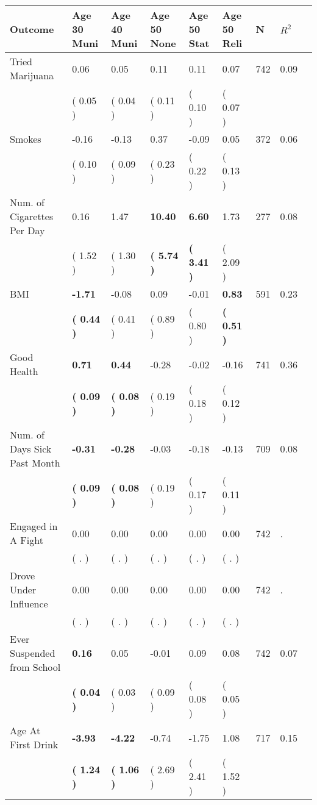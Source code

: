 \begin{tabular}{L{6.2cm} C{1.8cm} C{1.8cm} C{1.8cm} C{1.8cm} C{1.8cm} C{1.8cm} C{0.3cm} C{0.3cm}}
\toprule
 \textbf{Outcome} & \textbf{Age 30 Muni} & \textbf{Age 40 Muni} & \textbf{Age 50 None} & \textbf{Age 50 Stat} & \textbf{Age 50 Reli} & \textbf{N} & \textbf{$ R^2$} \\
\midrule
Tried Marijuana &      0.06 &      0.05 &      0.11 &      0.11 &      0.07  & 742 &       0.09 \\ 
 & (     0.05 ) & (     0.04 ) & (     0.11 ) & (     0.10 ) & (     0.07 )  & \\
Smokes &     -0.16 &     -0.13 &      0.37 &     -0.09 &      0.05  & 372 &       0.06 \\ 
 & (     0.10 ) & (     0.09 ) & (     0.23 ) & (     0.22 ) & (     0.13 )  & \\
Num. of Cigarettes Per Day &      0.16 &      1.47 & \textbf{    10.40} & \textbf{     6.60} &      1.73  & 277 &       0.08 \\ 
 & (     1.52 ) & (     1.30 ) & \textbf{(     5.74 )} & \textbf{(     3.41 )} & (     2.09 )  & \\
BMI & \textbf{    -1.71} &     -0.08 &      0.09 &     -0.01 & \textbf{     0.83}  & 591 &       0.23 \\ 
 & \textbf{(     0.44 )} & (     0.41 ) & (     0.89 ) & (     0.80 ) & \textbf{(     0.51 )}  & \\
Good Health & \textbf{     0.71} & \textbf{     0.44} &     -0.28 &     -0.02 &     -0.16  & 741 &       0.36 \\ 
 & \textbf{(     0.09 )} & \textbf{(     0.08 )} & (     0.19 ) & (     0.18 ) & (     0.12 )  & \\
Num. of Days Sick Past Month & \textbf{    -0.31} & \textbf{    -0.28} &     -0.03 &     -0.18 &     -0.13  & 709 &       0.08 \\ 
 & \textbf{(     0.09 )} & \textbf{(     0.08 )} & (     0.19 ) & (     0.17 ) & (     0.11 )  & \\
Engaged in A Fight &      0.00 &      0.00 &      0.00 &      0.00 &      0.00  & 742 &          . \\ 
 & (        . ) & (        . ) & (        . ) & (        . ) & (        . )  & \\
Drove Under Influence &      0.00 &      0.00 &      0.00 &      0.00 &      0.00  & 742 &          . \\ 
 & (        . ) & (        . ) & (        . ) & (        . ) & (        . )  & \\
Ever Suspended from School & \textbf{     0.16} &      0.05 &     -0.01 &      0.09 &      0.08  & 742 &       0.07 \\ 
 & \textbf{(     0.04 )} & (     0.03 ) & (     0.09 ) & (     0.08 ) & (     0.05 )  & \\
Age At First Drink & \textbf{    -3.93} & \textbf{    -4.22} &     -0.74 &     -1.75 &      1.08  & 717 &       0.15 \\ 
 & \textbf{(     1.24 )} & \textbf{(     1.06 )} & (     2.69 ) & (     2.41 ) & (     1.52 )  & \\
\bottomrule
\end{tabular}
